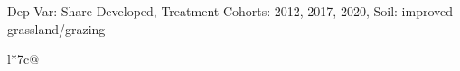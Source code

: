 \begin{table}[H]
\captionlistentry[table]{}
\label{table:beaver_land_class_DVis_land_class_3_SCg123_SSIGRG}
\scriptsize %
Dep Var: Share Developed, Treatment Cohorts: 2012, 2017, 2020, Soil: improved grassland/grazing \\
\begin{threeparttable}
\begin{tabulary}{\textwidth}{l*{7}{c}@{}}
\toprule \toprule
\noalign{\smallskip}
\noalign{\smallskip}
\midrule \bottomrule
\end{tabulary}
\medskip
\end{threeparttable}
\end{table}
